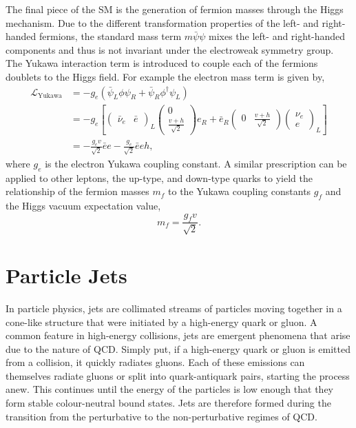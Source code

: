 The final piece of the SM is the generation of fermion masses through the Higgs mechanism.
Due to the different transformation properties of the left- and right-handed fermions, the standard mass term $m \bar \psi \psi$ mixes the left- and right-handed components and thus is not invariant under the electroweak symmetry group.
The Yukawa interaction term is introduced to couple each of the fermions doublets to the Higgs field.
For example the electron mass term is given by,
\begin{equation}
    \label{eq:yukawa}
    \begin{split}
        \mathcal{L}_\text{Yukawa} & = -g_e( \bar \psi_L \phi \psi_R + \bar \psi_R \phi^\dagger \psi_L)    \\
                                  & = -g_e \left[
            \begin{pmatrix} \bar \nu_e & \bar e \end{pmatrix}_L \begin{pmatrix} 0 \\ \frac{v + h}{\sqrt{2}} \end{pmatrix} e_R
            + \bar e_R \begin{pmatrix} 0 & \frac{v + h}{\sqrt{2}} \end{pmatrix} \begin{pmatrix} \nu_e \\ e \end{pmatrix}_L
        \right]                                                                                           \\
                                  & = -\frac{g_e v}{\sqrt{2}} \bar e e - \frac{g_e}{\sqrt{2}} \bar e e h,
    \end{split}
\end{equation}
where $g_e$ is the electron Yukawa coupling constant.
A similar prescription can be applied to other leptons, the up-type, and down-type quarks to yield the relationship of the fermion masses $m_f$ to the Yukawa coupling constants $g_f$ and the Higgs vacuum expectation value,
\begin{equation}
    \label{eq:fermion_mass}
    m_f = \frac{g_f v}{\sqrt{2}}.
\end{equation}

\section{Particle Jets}
\label{sec:jets}

In particle physics, jets are collimated streams of particles moving together in a cone-like structure that were initiated by a high-energy quark or gluon.
A common feature in high-energy collisions, jets are emergent phenomena that arise due to the nature of QCD.
Simply put, if a high-energy quark or gluon is emitted from a collision, it quickly radiates gluons.
Each of these emissions can themselves radiate gluons or split into quark-antiquark pairs, starting the process anew.
This continues until the energy of the particles is low enough that they form stable colour-neutral bound states.
Jets are therefore formed during the transition from the perturbative to the non-perturbative regimes of QCD.

